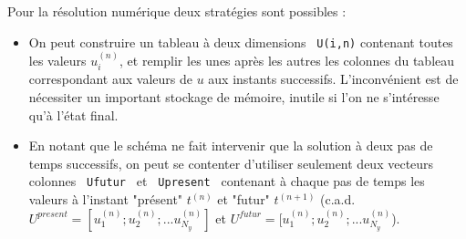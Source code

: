 \documentclass[a4,12pt]{article}
\begin{document}
Pour la résolution numérique deux stratégies sont possibles :
\begin{itemize}
\item 
On peut construire un tableau à deux dimensions \verb| U(i,n)| contenant toutes les valeurs $u_{i}^{(n)}$, et remplir les unes après les autres les colonnes du tableau correspondant aux valeurs de $u$ aux instants successifs. L'inconvénient est de nécessiter un important stockage de mémoire, inutile si l'on ne s'intéresse qu'à l'état final.
\item 
En notant que le schéma ne fait intervenir que la solution à deux pas de temps successifs, on peut se contenter d'utiliser seulement deux vecteurs colonnes 
\verb| Ufutur | et \verb| Upresent |  contenant à chaque pas de temps les valeurs à l'instant 
"présent" $t^{(n)}$ et "futur"  $t^{(n+1)}$ (c.a.d. $ U^{present} = [u_1^{(n)}; u_2^{(n)}; ... u_{N_y}^{(n)} ] $ et   $U^{futur} = [u_1^{(n)}; u_2^{(n)}; ... u_{N_y}^{(n)}$).
\end{itemize}
\end{document}
